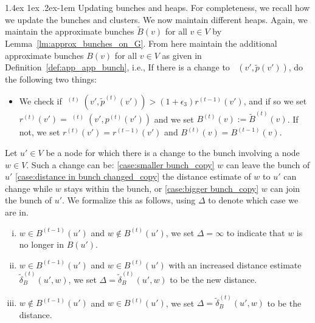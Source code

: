\documentclass[11pt]{article}
\makeatletter
\theoremstyle{definition}
\theoremstyle{remark}
\DeclareMathOperator{\dLNbunch}{\delta_{\tilde{B}}}
\renewcommand{\paragraph}{%
  \@startsection{paragraph}{4}%
  {\z@}{1.4ex \@plus 1ex \@minus .2ex}{-1em}%
  {\normalfont\normalsize\bfseries}%
}
\makeatother
\begin{document}
\begin{titlepage}
\paragraph{Updating bunches and heaps.}
For completeness, we recall how we update the bunches and clusters. We now maintain different heaps. Again, we maintain the approximate bunches $\tilde B(v)$ for all $v\in V$ by Lemma~\ref{lm:approx_bunches_on_G}. From here maintain the additional approximate bunches $B(v)$ for all $v\in V$ as given in Definition~\ref{def:app_app_bunch}, i.e., 
If there is a change to $\dLNbunch(v',\tilde p(v'))$, do the following two things:
    \begin{itemize}
        \item We check if $\dLNbunch^{(t)}(v',\tilde p^{(t)}(v'))> (1+\epsilon_3)r^{(t-1)}(v')$, and if so we set $r^{(t)}(v')=\dLNbunch^{(t)}(v',p^{(t)}(v'))$ and we set $B^{(t)}(v):=\tilde B^{(t)}(v)$. If not, we set $r^{(t)}(v')=r^{(t-1)}(v')$ and $B^{(t)}(v)=B^{(t-1)}(v)$.
    \end{itemize}
 Let $u'\in V$ be a node for which there is a change to the bunch involving a node $w\in V$. Such a change can be: \ref{case:smaller bunch_copy} $w$ can leave the bunch of $u'$ \ref{case:distance in bunch changed_copy} the distance estimate of $w$ to $u'$ can change while $w$ stays within the bunch, or \ref{case:bigger bunch_copy} $w$ can join the bunch of $u'$. We formalize this as follows, using $\Delta$ to denote which case we are in.
    \begin{enumerate}[(i)]
        \item $w\in B^{(t-1)}(u')$ and $w\notin B^{(t)}(u')$, we set $\Delta=\infty$ to indicate that $w$ is no longer in $B(u')$. \label{case:smaller bunch_copy}
        \item $w\in B^{(t-1)}(u')$ and $w\in B^{(t)}(u')$ with an increased distance estimate $\tilde \delta_B^{(t)}(u',w)$, we set $\Delta=\tilde \delta_B^{(t)}(u',w)$ to be the new distance. \label{case:distance in bunch changed_copy}
        \item \label{case:bigger bunch_copy} $w\notin B^{(t-1)}(u')$ and $w\in B^{(t)}(u')$, we set $\Delta=\tilde \delta_B^{(t)}(u',w)$ to be the distance. 
    \end{enumerate}
        
    
    

\end{titlepage}
\end{document}
